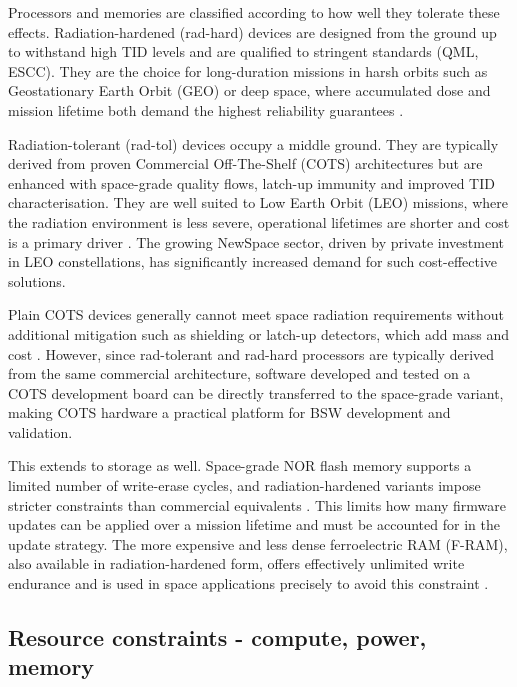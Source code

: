 Processors and memories are classified according to how well they tolerate these effects. Radiation-hardened (rad-hard) devices are designed from the ground up to withstand high TID levels and are qualified to stringent standards (QML, ESCC). They are the choice for long-duration missions in harsh orbits such as Geostationary Earth Orbit (GEO) or deep space, where accumulated dose and mission lifetime both demand the highest reliability guarantees \cite{microchip_rad_tolerant}.

Radiation-tolerant (rad-tol) devices occupy a middle ground. They are typically derived from proven Commercial Off-The-Shelf (COTS) architectures but are enhanced with space-grade quality flows, latch-up immunity and improved TID characterisation. They are well suited to Low Earth Orbit (LEO) missions, where the radiation environment is less severe, operational lifetimes are shorter and cost is a primary driver \cite{microchip_rad_tolerant}. The growing NewSpace sector, driven by private investment in LEO constellations, has significantly increased demand for such cost-effective solutions.

Plain COTS devices generally cannot meet space radiation requirements without additional mitigation such as shielding or latch-up detectors, which add mass and cost \cite{microchip_rad_tolerant}. However, since rad-tolerant and rad-hard processors are typically derived from the same commercial architecture, software developed and tested on a COTS development board can be directly transferred to the space-grade variant, making COTS hardware a practical platform for BSW development and validation.

This extends to storage as well. Space-grade NOR flash memory supports a limited number of write-erase cycles, and radiation-hardened variants impose stricter constraints than commercial equivalents \cite{infineon_space_memories}. This limits how many firmware updates can be applied over a mission lifetime and must be accounted for in the update strategy. The more expensive and less dense ferroelectric RAM (F-RAM), also available in radiation-hardened form, offers effectively unlimited write endurance and is used in space applications precisely to avoid this constraint \cite{infineon_space_memories}.

\subsection{Resource constraints - compute, power, memory}
\label{subsection:bg-space-resources}

